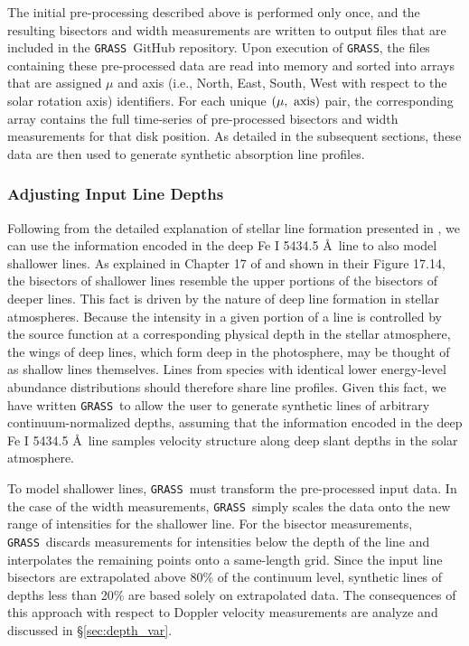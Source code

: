 \documentclass[twocolumn]{aastex63}
\newcommand{\grass}{\texttt{GRASS}}
\newcommand{\revise}[1]{#1}
\begin{document}
The initial pre-processing described above is performed only once, and the resulting bisectors and width measurements are written to output files that are included in the \grass\ GitHub repository. Upon execution of \grass, the files containing these pre-processed data are read into memory and sorted into arrays that are assigned $\mu$ and axis \revise{(i.e., North, East, South, West with respect to the solar rotation axis)} identifiers. For each unique \revise{$(\mu{\rm,\ axis})$} pair, the corresponding array contains the full time-series of pre-processed bisectors and width measurements for that disk position. As detailed in the subsequent sections, these data are then used to generate synthetic absorption line profiles. \par

\subsubsection{Adjusting Input Line Depths} \label{sec:scale_chop}

Following from the detailed explanation of stellar line formation presented in \citet{Gray2008}, we \revise{can} use the information encoded in the deep Fe \textsc{I} 5434.5 \AA\ line to also model shallower lines. As explained in Chapter 17 of \citet{Gray2008} and shown in their Figure 17.14, the bisectors of shallower lines resemble the upper portions of the bisectors of deeper lines. This fact is driven by the nature of deep line formation in stellar atmospheres. Because the intensity in a given portion of a line is controlled by the source function at a corresponding physical depth in the stellar atmosphere, the wings of deep lines, which form deep in the photosphere, may be thought of as shallow lines themselves. Lines from species with identical lower energy-level abundance distributions should therefore share line profiles. Given this fact, we have written \grass\ to allow the user to generate synthetic lines of arbitrary continuum-normalized depths, assuming that the information encoded in the deep Fe \textsc{I} 5434.5 \AA\ line samples velocity structure along deep slant depths in the solar atmosphere. \par  

To model shallower lines, \grass\ must transform the pre-processed input data. In the case of the width measurements, \grass\ simply scales the data onto the new range of intensities for the shallower line. For the bisector measurements, \grass\ discards measurements for intensities below the depth of the line and interpolates the remaining points onto a same-length grid. \revise{Since the input line bisectors are extrapolated above 80\% of the continuum level, synthetic lines of depths less than 20\% are based solely on extrapolated data.} The consequences of this approach with respect to Doppler velocity measurements are analyze and discussed in \S\ref{sec:depth_var}. \par 
\end{document}
